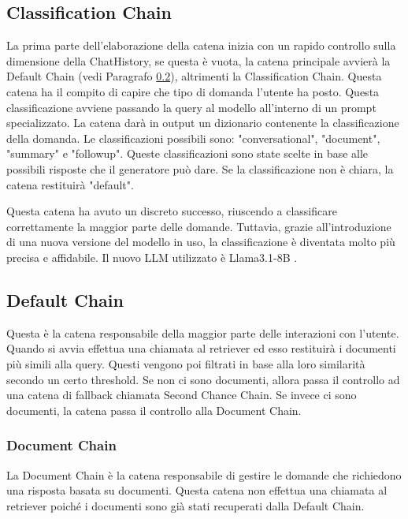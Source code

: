 \subsection{Classification Chain}
La prima parte dell'elaborazione della catena inizia con un rapido controllo sulla dimensione della ChatHistory, se questa è vuota, la catena principale avvierà la Default Chain (vedi Paragrafo \ref{sec:defaultchain}), altrimenti la Classification Chain. Questa catena ha il compito di capire che tipo di domanda l'utente ha posto.
Questa classificazione avviene passando la query al modello all'interno di un prompt specializzato. La catena darà in output un dizionario contenente la classificazione della domanda. Le classificazioni possibili sono: "conversational", "document", "summary" e "followup". Queste classificazioni sono state scelte in base alle possibili risposte che il generatore può dare. Se la classificazione non è chiara, la catena restituirà "default".

Questa catena ha avuto un discreto successo, riuscendo a classificare correttamente la maggior parte delle domande. Tuttavia, grazie all'introduzione di una nuova versione del modello in uso, la classificazione è diventata molto più precisa e affidabile. Il nuovo LLM utilizzato è Llama3.1-8B \cite{llama318b}.

\subsection{Default Chain}
\label{sec:defaultchain}
Questa è la catena responsabile della maggior parte delle interazioni con l'utente. Quando si avvia effettua una chiamata al retriever ed esso restituirà i documenti più simili alla query. Questi vengono poi filtrati in base alla loro similarità secondo un certo threshold. Se non ci sono documenti, allora passa il controllo ad una catena di fallback chiamata Second Chance Chain. Se invece ci sono documenti, la catena passa il controllo alla Document Chain.

\subsubsection{Document Chain}
La Document Chain è la catena responsabile di gestire le domande che richiedono una risposta basata su documenti. Questa catena non effettua una chiamata al retriever poiché i documenti sono già stati recuperati dalla Default Chain.

